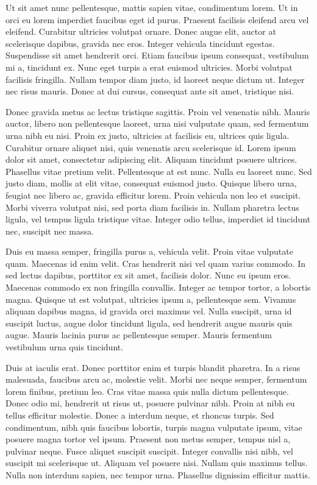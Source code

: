 Ut sit amet nunc pellentesque, mattis sapien vitae, condimentum lorem. Ut in
orci eu lorem imperdiet faucibus eget id purus. Praesent facilisis eleifend
arcu vel eleifend. Curabitur ultricies volutpat ornare. Donec augue elit,
auctor at scelerisque dapibus, gravida nec eros. Integer vehicula tincidunt
egestas. Suspendisse sit amet hendrerit orci. Etiam faucibus ipsum consequat,
vestibulum mi a, tincidunt ex. Nunc eget turpis a erat euismod ultricies. Morbi
volutpat facilisis fringilla. Nullam tempor diam justo, id laoreet neque dictum
ut. Integer nec risus mauris. Donec at dui cursus, consequat ante sit amet,
tristique nisi.

Donec gravida metus ac lectus tristique sagittis. Proin vel venenatis nibh.
Mauris auctor, libero non pellentesque laoreet, urna nisi vulputate quam, sed
fermentum urna nibh eu nisi. Proin ex justo, ultricies at facilisis eu,
ultrices quis ligula. Curabitur ornare aliquet nisi, quis venenatis arcu
scelerisque id. Lorem ipsum dolor sit amet, consectetur adipiscing elit.
Aliquam tincidunt posuere ultrices. Phasellus vitae pretium velit. Pellentesque
at est nunc. Nulla eu laoreet nunc. Sed justo diam, mollis at elit vitae,
consequat euismod justo. Quisque libero urna, feugiat nec libero ac, gravida
efficitur lorem. Proin vehicula non leo et suscipit. Morbi viverra volutpat
nisi, sed porta diam facilisis in. Nullam pharetra lectus ligula, vel tempus
ligula tristique vitae. Integer odio tellus, imperdiet id tincidunt nec,
suscipit nec massa.

Duis eu massa semper, fringilla purus a, vehicula velit. Proin vitae vulputate
quam. Maecenas id enim velit. Cras hendrerit nisi vel quam varius commodo. In
sed lectus dapibus, porttitor ex sit amet, facilisis dolor. Nunc eu ipsum eros.
Maecenas commodo ex non fringilla convallis. Integer ac tempor tortor, a
lobortis magna. Quisque ut est volutpat, ultricies ipsum a, pellentesque sem.
Vivamus aliquam dapibus magna, id gravida orci maximus vel. Nulla suscipit,
urna id suscipit luctus, augue dolor tincidunt ligula, sed hendrerit augue
mauris quis augue. Mauris lacinia purus ac pellentesque semper. Mauris
fermentum vestibulum urna quis tincidunt.

Duis at iaculis erat. Donec porttitor enim et turpis blandit pharetra. In a
risus malesuada, faucibus arcu ac, molestie velit. Morbi nec neque semper,
fermentum lorem finibus, pretium leo. Cras vitae massa quis nulla dictum
pellentesque. Donec odio mi, hendrerit ut risus ut, posuere pulvinar nibh.
Proin at nibh eu tellus efficitur molestie. Donec a interdum neque, et rhoncus
turpis. Sed condimentum, nibh quis faucibus lobortis, turpis magna vulputate
ipsum, vitae posuere magna tortor vel ipsum. Praesent non metus semper, tempus
nisl a, pulvinar neque. Fusce aliquet suscipit suscipit. Integer convallis nisi
nibh, vel suscipit mi scelerisque ut. Aliquam vel posuere nisi. Nullam quis
maximus tellus. Nulla non interdum sapien, nec tempor urna. Phasellus dignissim
efficitur mattis.

